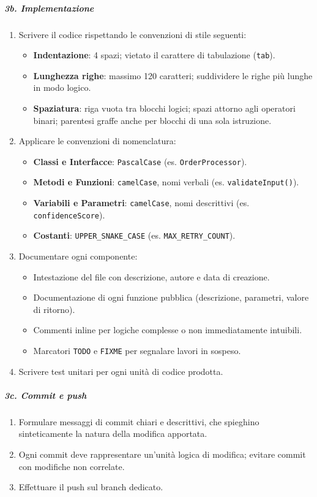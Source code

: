 \documentclass[a4paper, 11pt, oneside]{scrartcl}
\begin{document}
\subparagraph{3b. Implementazione}
\begin{enumerate}
    \item Scrivere il codice rispettando le convenzioni di stile seguenti:
    \begin{itemize}
        \item \textbf{Indentazione}: 4 spazi; vietato il carattere di tabulazione (\texttt{tab}).
        \item \textbf{Lunghezza righe}: massimo 120 caratteri; suddividere le righe più lunghe in modo logico.
        \item \textbf{Spaziatura}: riga vuota tra blocchi logici; spazi attorno agli operatori binari; parentesi graffe anche per blocchi di una sola istruzione.
    \end{itemize}
    \item Applicare le convenzioni di nomenclatura:
    \begin{itemize}
        \item \textbf{Classi e Interfacce}: \texttt{PascalCase}{\scriptsize{}} (es. \texttt{OrderProcessor}).
        \item \textbf{Metodi e Funzioni}: \texttt{camelCase}{\scriptsize{}}, nomi verbali (es. \texttt{validateInput()}).
        \item \textbf{Variabili e Parametri}: \texttt{camelCase}, nomi descrittivi (es. \texttt{confidenceScore}).
        \item \textbf{Costanti}: \texttt{UPPER\_SNAKE\_CASE} (es. \texttt{MAX\_RETRY\_COUNT}).
    \end{itemize}
    \item Documentare ogni componente:
    \begin{itemize}
        \item Intestazione del file con descrizione, autore e data di creazione.
        \item Documentazione di ogni funzione pubblica (descrizione, parametri, valore di ritorno).
        \item Commenti inline per logiche complesse o non immediatamente intuibili.
        \item Marcatori \texttt{TODO} e \texttt{FIXME} per segnalare lavori in sospeso.
    \end{itemize}
    \item Scrivere test unitari per ogni unità di codice prodotta.
\end{enumerate}

\subparagraph{3c. Commit e push}
\begin{enumerate}
    \item Formulare messaggi di commit{\scriptsize{}} chiari e descrittivi, che spieghino sinteticamente la natura della modifica apportata.
    \item Ogni commit deve rappresentare un'unità logica di modifica; evitare commit con modifiche non correlate.
    \item Effettuare il push sul branch dedicato.
\end{enumerate}
\end{document}
